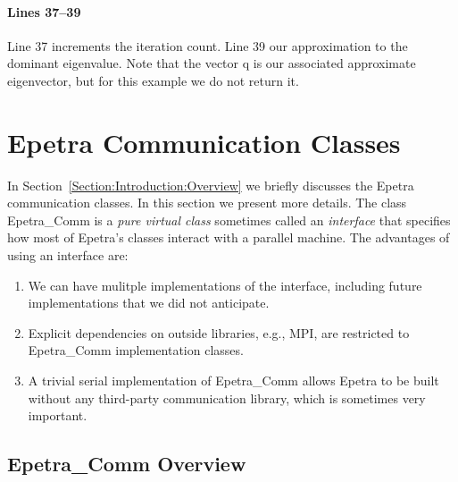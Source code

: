 \documentclass[12pt,relax]{EpetraUserGuide}
\newcommand{\comm}{Epetra\_Comm}
\begin{document}
\paragraph{Lines 37--39}
Line 37 increments the iteration count.  Line 39 our approximation to
the dominant eigenvalue.  Note that the vector q is our associated
approximate eigenvector, but for this example we do not return it.

\section{Epetra Communication Classes}

In Section~\ref{Section:Introduction:Overview} we briefly discusses
the Epetra communication classes.  In this section we present more
details.  The class \comm{} is a {\it pure virtual class} sometimes
called an {\it interface} that
specifies how most of Epetra's classes interact with a parallel
machine.  The advantages of using an interface are:
\begin{enumerate}
\item We can have mulitple implementations of the interface, including future
implementations that we did not anticipate.  
\item Explicit dependencies on outside libraries, e.g., MPI, are
restricted to \comm{} implementation classes.
\item A trivial serial implementation of \comm{} allows Epetra to be
built without any third-party communication library, which is
sometimes very important.
\end{enumerate}

\subsection{\comm{} Overview}
\end{document}

